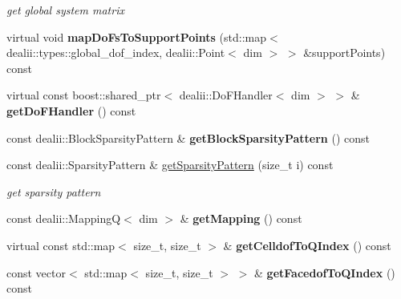 \begin{DoxyCompactItemize}
\begin{DoxyCompactList}\small\item\em get global system matrix \item\end{DoxyCompactList}\item 
\hypertarget{classnatrium_1_1SEDGMinLee_ac1f5ecd80111566dd53804b6db2a1cb3}{
virtual void {\bfseries mapDoFsToSupportPoints} (std::map$<$ dealii::types::global\_\-dof\_\-index, dealii::Point$<$ dim $>$ $>$ \&supportPoints) const }
\label{classnatrium_1_1SEDGMinLee_ac1f5ecd80111566dd53804b6db2a1cb3}

\item 
\hypertarget{classnatrium_1_1SEDGMinLee_abd088667b6ff315c440d00cd0eb26840}{
virtual const boost::shared\_\-ptr$<$ dealii::DoFHandler$<$ dim $>$ $>$ \& {\bfseries getDoFHandler} () const }
\label{classnatrium_1_1SEDGMinLee_abd088667b6ff315c440d00cd0eb26840}

\item 
\hypertarget{classnatrium_1_1SEDGMinLee_a10acabaac20a992130e88fb9bd395d31}{
const dealii::BlockSparsityPattern \& {\bfseries getBlockSparsityPattern} () const }
\label{classnatrium_1_1SEDGMinLee_a10acabaac20a992130e88fb9bd395d31}

\item 
const dealii::SparsityPattern \& \hyperlink{classnatrium_1_1SEDGMinLee_ac9392932aaab8186b427b9d12bc64771}{getSparsityPattern} (size\_\-t i) const 
\begin{DoxyCompactList}\small\item\em get sparsity pattern \item\end{DoxyCompactList}\item 
\hypertarget{classnatrium_1_1SEDGMinLee_ab888ac14b8ef33ed706b5d63deea86ae}{
const dealii::MappingQ$<$ dim $>$ \& {\bfseries getMapping} () const }
\label{classnatrium_1_1SEDGMinLee_ab888ac14b8ef33ed706b5d63deea86ae}

\item 
\hypertarget{classnatrium_1_1SEDGMinLee_aec38323cbd34487a73b4f62f0a310ceb}{
virtual const std::map$<$ size\_\-t, size\_\-t $>$ \& {\bfseries getCelldofToQIndex} () const }
\label{classnatrium_1_1SEDGMinLee_aec38323cbd34487a73b4f62f0a310ceb}

\item 
\hypertarget{classnatrium_1_1SEDGMinLee_a8b7d94c90ccfa5e341d854059d883f57}{
const vector$<$ std::map$<$ size\_\-t, size\_\-t $>$ $>$ \& {\bfseries getFacedofToQIndex} () const }
\label{classnatrium_1_1SEDGMinLee_a8b7d94c90ccfa5e341d854059d883f57}


\end{DoxyCompactItemize}
